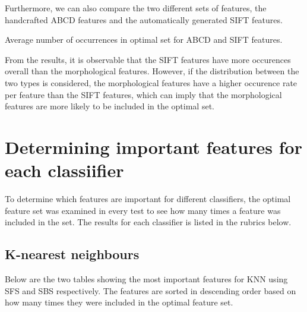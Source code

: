 \documentclass{kththesis}
\begin{document}
Furthermore, we can also compare the two different sets of features, the handcrafted ABCD features and the automatically generated SIFT features.

\begin{table}[h!]
  \caption{Average number of occurrences in optimal set for ABCD and SIFT features.}
\end{table}

From the results, it is observable that the SIFT features have more occurences overall than the morphological features. However, if the distribution between the two types is considered, the morphological features have a higher occurence rate per feature than the SIFT features, which can imply that the morphological features are more likely to be included in the optimal set.

\section{Determining important features for each classiifier}

To determine which features are important for different classifiers, the optimal feature set was examined in every test to see how many times a feature was included in the set. The results for each classifier is listed in the rubrics below.

\subsection{K-nearest neighbours}

Below are the two tables showing the most important features for KNN using SFS and SBS respectively. The features are sorted in descending order based on how many times they were included in the optimal feature set.
\end{document}

